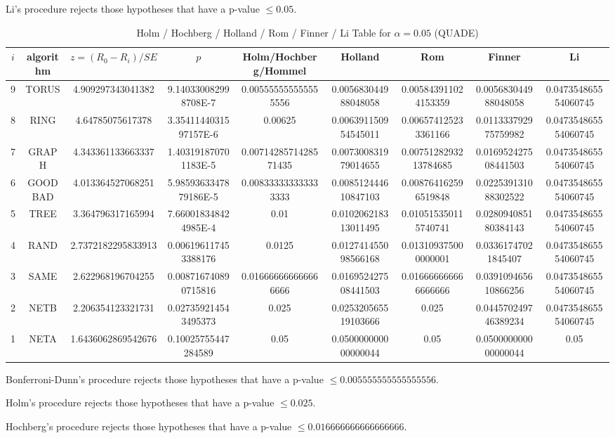 \documentclass[a4paper,10pt]{article}
\begin{document}
\begin{landscape}
Li's procedure rejects those hypotheses that have a p-value $\le0.05$.



\newpage

\begin{table}[!htp]
\centering\scriptsize
\caption{Holm / Hochberg / Holland / Rom / Finner / Li Table for $\alpha=0.05$ (QUADE)}
\begin{tabular}{ccccccccc}
$i$&algorithm&$z=(R_0 - R_i)/SE$&$p$&Holm/Hochberg/Hommel&Holland&Rom&Finner&Li\\
\hline
9& TORUS&4.909297343041382&9.140330082998708E-7&0.005555555555555556&0.005683044988048058&0.005843911024153359&0.005683044988048058&0.047354865554060745\\
8& RING&4.64785075617378&3.3541144031597157E-6&0.00625&0.006391150954545011&0.006574125233361166&0.011333792975759982&0.047354865554060745\\
7& GRAPH&4.343361133663337&1.403191870701183E-5&0.0071428571428571435&0.007300831979014655&0.0075128293213784685&0.016952427508441503&0.047354865554060745\\
6& GOODBAD&4.013364527068251&5.9859363347879186E-5&0.008333333333333333&0.008512444610847103&0.008764162596519848&0.022539131088302522&0.047354865554060745\\
5& TREE&3.364796317165994&7.660018348424985E-4&0.01&0.010206218313011495&0.010515350115740741&0.028094085180384143&0.047354865554060745\\
4& RAND&2.7372182295833913&0.006196117453388176&0.0125&0.012741455098566168&0.013109375000000001&0.03361747021845407&0.047354865554060745\\
3& SAME&2.622968196704255&0.008716740890715816&0.016666666666666666&0.016952427508441503&0.016666666666666666&0.039109465610866256&0.047354865554060745\\
2& NETB&2.206354123321731&0.027359214543495373&0.025&0.025320565519103666&0.025&0.044570249746389234&0.047354865554060745\\
1& NETA&1.6436062869542676&0.10025755447284589&0.05&0.050000000000000044&0.05&0.050000000000000044&0.05\\
\hline
\end{tabular}
\end{table}
Bonferroni-Dunn's procedure rejects those hypotheses that have a p-value $\le0.005555555555555556$.


Holm's procedure rejects those hypotheses that have a p-value $\le0.025$.


Hochberg's procedure rejects those hypotheses that have a p-value $\le0.016666666666666666$.



\end{landscape}
\end{document}
